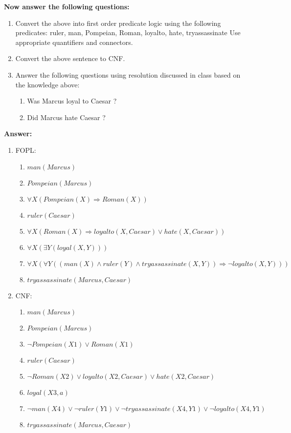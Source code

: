 \documentclass{article}%
\begin{document}
\begin{enumerate}
\textbf{Now answer the following questions:}

	\begin{enumerate}
	\item Convert the above into first order predicate logic using the following predicates: ruler, man, Pompeian, Roman, loyalto, hate, tryassassinate Use appropriate quantifiers and connectors.
	\item Convert the above sentence to CNF.
	\item Answer the following questions using resolution discussed in class based on the knowledge above:
		\begin{enumerate}
		\item Was Marcus loyal to Caesar ?
		\item Did Marcus hate Caesar ?
		\end{enumerate}

	\end{enumerate}
	
	\textbf{Answer:}\\
	\begin{enumerate}
	\item FOPL:
		\begin{enumerate}
		\item $ man(Marcus) $
		\item $ Pompeian(Marcus) $
		\item $ \forall X (Pompeian(X) \Rightarrow Roman(X)) $
		\item $ ruler(Caesar) $
		\item $ \forall X (Roman(X) \Rightarrow loyalto(X, Caesar) \vee hate(X, Caesar)) $
		\item $ \forall X (\exists Y (loyal(X, Y))) $
		\item $ \forall X (\forall Y ( (man(X) \wedge ruler(Y) \wedge tryassassinate(X,Y) ) \Rightarrow \neg loyalto(X,Y))) $
		\item $ tryassassinate(Marcus, Caesar) $
		\end{enumerate}
	\item CNF: 
		\begin{enumerate}
		\item $ man(Marcus) $
		\item $ Pompeian(Marcus) $
		\item $ \neg Pompeian(X1) \vee Roman(X1) $
		\item $ ruler(Caesar) $
		\item $ \neg Roman(X2) \vee loyalto(X2, Caesar) \vee hate(X2, Caesar) $
		\item $ loyal(X3, a) $
		\item $ \neg man(X4) \vee \neg ruler(Y1) \vee \neg tryassassinate(X4,Y1)  \vee \neg loyalto(X4,Y1) $
		\item $ tryassassinate(Marcus, Caesar) $
		\end{enumerate}
		

\end{enumerate}
\end{enumerate}
\end{document}
